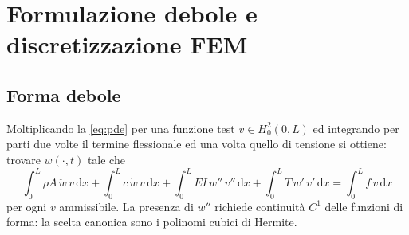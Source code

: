 \documentclass[11pt,a4paper]{article}
\begin{document}
\section{Formulazione debole e discretizzazione FEM}
\subsection{Forma debole}
Moltiplicando la \eqref{eq:pde} per una funzione test $v \in H^2_0(0,L)$ ed
integrando per parti due volte il termine flessionale ed una volta quello di
tensione si ottiene: trovare $w(\cdot,t)$ tale che
\begin{equation}
\int_0^L \rho A\, \ddot{w}\, v\,\mathrm{d}x
+ \int_0^L c\, \dot{w}\, v\,\mathrm{d}x
+ \int_0^L EI\, w''\, v''\,\mathrm{d}x
+ \int_0^L T\, w'\, v'\,\mathrm{d}x
= \int_0^L f\, v\,\mathrm{d}x
\label{eq:weak}
\end{equation}
per ogni $v$ ammissibile. La presenza di $w''$ richiede continuit\`a $C^1$
delle funzioni di forma: la scelta canonica sono i polinomi cubici di Hermite.
\end{document}
